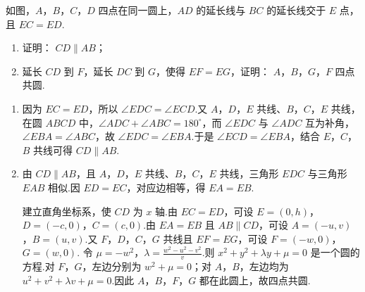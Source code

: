 \begin{problem}
如图，\(A\)，\(B\)，\(C\)，\(D\) 四点在同一圆上，\(AD\) 的延长线与 \(BC\) 的延长线交于 \(E\) 点，且 \(EC = ED\).
\begin{enumerate}
\item 证明： \(CD \parallel AB\)；
\item 延长 \(CD\) 到 \(F\)，延长 \(DC\) 到 \(G\)，使得 \(EF = EG\)，证明： \(A\)，\(B\)，\(G\)，\(F\) 四点共圆.
\end{enumerate}

\end{problem}

\begin{solution}
\begin{enumerate}
\item 因为 \(EC=ED\)，所以 \(\angle EDC=\angle ECD\).又 \(A\)，\(D\)，\(E\) 共线、\(B\)，\(C\)，\(E\) 共线，在圆 \(ABCD\) 中，\(\angle ADC+\angle ABC=180^\circ\)，而 \(\angle EDC\) 与 \(\angle ADC\) 互为补角，\(\angle EBA=\angle ABC\)，故 \(\angle EDC=\angle EBA\).于是 \(\angle ECD=\angle EBA\)，结合 \(E\)，\(C\)，\(B\) 共线可得 \(CD\parallel AB\).
\item 由 \(CD\parallel AB\)，且 \(A\)，\(D\)，\(E\) 共线、\(B\)，\(C\)，\(E\) 共线，三角形 \(EDC\) 与三角形 \(EAB\) 相似.因 \(ED=EC\)，对应边相等，得 \(EA=EB\).

建立直角坐标系，使 \(CD\) 为 \(x\) 轴.由 \(EC=ED\)，可设
\(\displaystyle E=(0,h)\)，\(D=(-c,0)\)，\(C=(c,0)\).由 \(EA=EB\) 且 \(AB\parallel CD\)，可设
\(\displaystyle A=(-u,v)\)，\(B=(u,v)\).又 \(F\)，\(D\)，\(C\)，\(G\) 共线且 \(EF=EG\)，可设
\(\displaystyle F=(-w,0)\)，\(G=(w,0)\).
令 \(\displaystyle \mu=-w^2\)，\(\lambda=\frac{w^2-u^2-v^2}{v}\).则
\(\displaystyle x^2+y^2+\lambda y+\mu=0\) 是一个圆的方程.对 \(F\)，\(G\)，左边分别为 \(w^2+\mu=0\)；对 \(A\)，\(B\)，左边均为 \(u^2+v^2+\lambda v+\mu=0\).因此 \(A\)，\(B\)，\(F\)，\(G\) 都在此圆上，故四点共圆.
\end{enumerate}
\end{solution}

